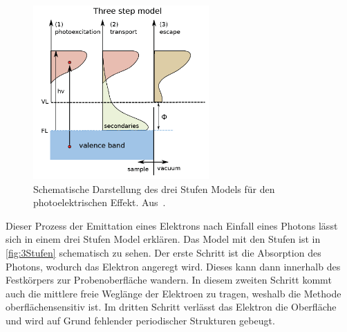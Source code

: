         \begin{figure}
            \centering
            \includegraphics[width=0.6\textwidth]{./content/3Stufen}
            \caption{Schematische Darstellung des drei Stufen Models für den photoelektrischen Effekt. Aus~\cite{zhang_synchrotron_2018}.}
            \label{fig:3Stufen}
        \end{figure}
        Dieser Prozess der Emittation eines Elektrons nach Einfall eines Photons lässt sich in einem drei Stufen Model erklären.
        Das Model mit den Stufen ist in \autoref{fig:3Stufen} schematisch zu sehen.
        Der erste Schritt ist die Absorption des Photons, wodurch das Elektron angeregt wird. 
        Dieses kann dann innerhalb des Festkörpers zur Probenoberfläche wandern.
        In diesem zweiten Schritt kommt auch die mittlere freie Weglänge der Elektroen zu tragen, weshalb die Methode oberflächensensitiv ist.
        Im dritten Schritt verlässt das Elektron die Oberfläche und wird auf Grund fehlender periodischer Strukturen gebeugt.

